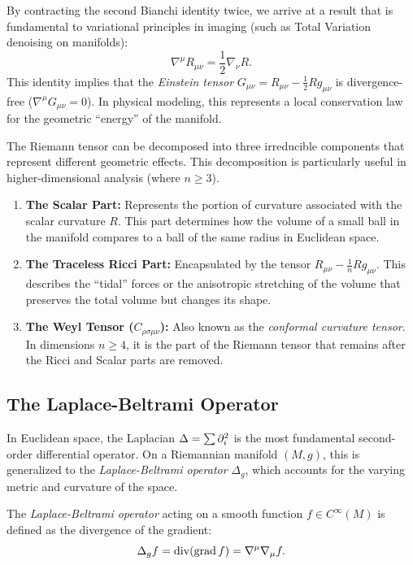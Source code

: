 By contracting the second Bianchi identity twice, we arrive at a result that is fundamental to variational principles in imaging (such as Total Variation denoising on manifolds):
\begin{equation}
  \nabla^\mu R_{\mu\nu} = \frac{1}{2} \nabla_\nu R
.\end{equation}
This identity implies that the \emph{Einstein tensor} $G_{\mu\nu} = R_{\mu\nu} - \frac{1}{2}Rg_{\mu\nu}$ is divergence-free ($\nabla^\mu G_{\mu\nu} = 0$). In physical modeling, this represents a local conservation law for the geometric ``energy'' of the manifold.

The Riemann tensor can be decomposed into three irreducible components that represent different geometric effects. This decomposition is particularly useful in higher-dimensional analysis (where $n \geq 3$).
\begin{enumerate}
  \item \textbf{The Scalar Part:} Represents the portion of curvature associated with the scalar curvature $R$. This part determines how the volume of a small ball in the manifold compares to a ball of the same radius in Euclidean space.

  \item \textbf{The Traceless Ricci Part:} Encapsulated by the tensor $R_{\mu\nu} - \frac{1}{n} R g_{\mu\nu}$. This describes the ``tidal'' forces or the anisotropic stretching of the volume that preserves the total volume but changes its shape.

  \item \textbf{The Weyl Tensor ($C_{\rho\sigma\mu\nu}$):} Also known as the \emph{conformal curvature tensor}. In dimensions $n \geq 4$, it is the part of the Riemann tensor that remains after the Ricci and Scalar parts are removed.
\end{enumerate}

\subsection{The Laplace-Beltrami Operator}

In Euclidean space, the Laplacian $\Delta = \sum \pd{i}^2$ is the most fundamental second-order differential operator. On a Riemannian manifold $(M, g)$, this is generalized to the \emph{Laplace-Beltrami operator} $\Delta_g$, which accounts for the varying metric and curvature of the space.
\begin{definition}
  The \emph{Laplace-Beltrami operator} acting on a smooth function $f \in C^\infty(M)$ is defined as the divergence of the gradient:
  \begin{equation}
    \Delta_g f = \operatorname{div}(\operatorname{grad} f) = \nabla^\mu \nabla_\mu f
  .\end{equation}
\end{definition}


